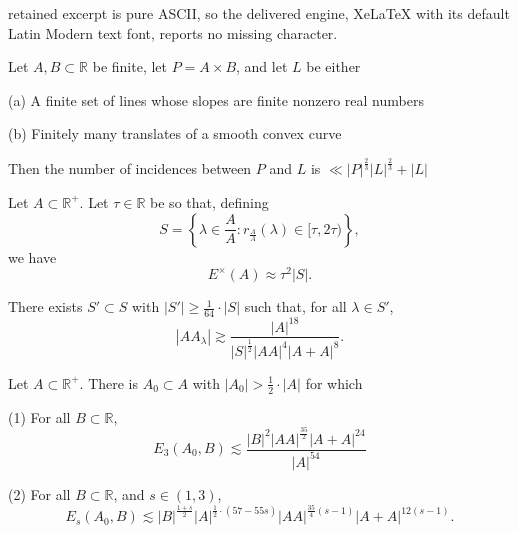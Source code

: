 \documentclass[10pt,a4paper]{amsart}
\begin{document}
retained excerpt is pure ASCII, so the delivered engine, XeLaTeX with its default Latin Modern text font, reports no missing character.
\begin{lemma}\label{lem:solymosi-szt}    
Let \(A,B \subset \mathbb{R}\) be finite, let \(P = A \times B\), and let \(L\) be either

(a) A finite set of lines whose slopes are finite nonzero real numbers

(b) Finitely many translates of a smooth convex curve

Then the number of incidences between \(P\) and \(L\) is \(\ll \left\lvert P \right\rvert ^{\frac{2}{3} }\left\lvert L \right\rvert ^{\frac{2}{3} } + \left\lvert L \right\rvert     \)
\end{lemma}

\begin{prop}\label{prop:rs-result}
Let \(A \subset \mathbb{R}^{+} \). Let \(\tau \in \mathbb{R} \) be so that, defining
\[
    S = \left\{ \lambda \in \frac{A}{A}  : r_{\frac{A}{A} } (\lambda) \in [\tau,2\tau) \right\} 
,\]
we have
\[
    E^{\times }(A) \approx \tau^{2} \left\lvert S  \right\rvert 
.\]

There exists \(S ' \subset S \) with \(\left\lvert S ' \right\rvert \geq \frac{1}{64} \cdot \left\lvert S \right\rvert \) such that,
for all \(\lambda \in S'\),
\[
    \left\lvert A A_{\lambda}  \right\rvert \gtrsim \frac{\left\lvert A \right\rvert ^{18}}{\left\lvert S  \right\rvert ^{\frac{1}{2} } \left\lvert AA \right\rvert ^{4} \left\lvert A + A \right\rvert ^{8}}
.\]
\end{prop}

\begin{lemma}\label{lem:SP-szt}
Let \(A \subset \mathbb{R} ^{+}\). There is \(A_0 \subset A\) with \(\left\lvert A_0 \right\rvert > \frac{1}{2} \cdot \left\lvert A \right\rvert \) for which

(1) For all \(B \subset \mathbb{R} \), 
\[
    E_3(A_0,B) \lesssim \frac{\left\lvert B \right\rvert ^{2} \left\lvert AA \right\rvert ^{\frac{35}{2} } \left\lvert A + A \right\rvert ^{24}}{\left\lvert A \right\rvert ^{54}} 
\]

(2) For all \(B \subset \mathbb{R} \), and \(s \in (1,3)\),
\[
    E_{s} (A_0,B) \lesssim \left\lvert B \right\rvert ^{\frac{1 + s}{2} } \left\lvert A \right\rvert ^{\frac{1}{2} \cdot \left( 57 - 55s \right) } \left\lvert AA \right\rvert ^{\frac{35}{4} (s-1)} \left\lvert A+A \right\rvert ^{12 \left( s-1 \right) }
.\]
\end{lemma}
\end{document}
